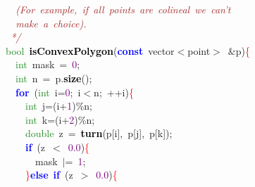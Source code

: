 {{\mbox{}\textit{\textcolor{Brown}{\ \ (For\ example,\ if\ all\ points\ are\ colineal\ we\ can't\ }} \\
\mbox{}\textit{\textcolor{Brown}{\ \ make\ a\ choice).}} \\
\mbox{}\textit{\textcolor{Brown}{\ */}} \\
\mbox{}\textcolor{ForestGreen}{bool}\ \textbf{\textcolor{Black}{isConvexPolygon}}\textcolor{BrickRed}{(}\textbf{\textcolor{Blue}{const}}\ vector\textcolor{BrickRed}{$<$}point\textcolor{BrickRed}{$>$}\ \textcolor{BrickRed}{\&}p\textcolor{BrickRed}{)}\textcolor{Red}{\{} \\
\mbox{}\ \ \textcolor{ForestGreen}{int}\ mask\ \textcolor{BrickRed}{=}\ \textcolor{Purple}{0}\textcolor{BrickRed}{;} \\
\mbox{}\ \ \textcolor{ForestGreen}{int}\ n\ \textcolor{BrickRed}{=}\ p\textcolor{BrickRed}{.}\textbf{\textcolor{Black}{size}}\textcolor{BrickRed}{();} \\
\mbox{}\ \ \textbf{\textcolor{Blue}{for}}\ \textcolor{BrickRed}{(}\textcolor{ForestGreen}{int}\ i\textcolor{BrickRed}{=}\textcolor{Purple}{0}\textcolor{BrickRed}{;}\ i\textcolor{BrickRed}{$<$}n\textcolor{BrickRed}{;}\ \textcolor{BrickRed}{++}i\textcolor{BrickRed}{)}\textcolor{Red}{\{} \\
\mbox{}\ \ \ \ \textcolor{ForestGreen}{int}\ j\textcolor{BrickRed}{=(}i\textcolor{BrickRed}{+}\textcolor{Purple}{1}\textcolor{BrickRed}{)\%}n\textcolor{BrickRed}{;} \\
\mbox{}\ \ \ \ \textcolor{ForestGreen}{int}\ k\textcolor{BrickRed}{=(}i\textcolor{BrickRed}{+}\textcolor{Purple}{2}\textcolor{BrickRed}{)\%}n\textcolor{BrickRed}{;} \\
\mbox{}\ \ \ \ \textcolor{ForestGreen}{double}\ z\ \textcolor{BrickRed}{=}\ \textbf{\textcolor{Black}{turn}}\textcolor{BrickRed}{(}p\textcolor{BrickRed}{[}i\textcolor{BrickRed}{],}\ p\textcolor{BrickRed}{[}j\textcolor{BrickRed}{],}\ p\textcolor{BrickRed}{[}k\textcolor{BrickRed}{]);} \\
\mbox{}\ \ \ \ \textbf{\textcolor{Blue}{if}}\ \textcolor{BrickRed}{(}z\ \textcolor{BrickRed}{$<$}\ \textcolor{Purple}{0.0}\textcolor{BrickRed}{)}\textcolor{Red}{\{} \\
\mbox{}\ \ \ \ \ \ mask\ \textcolor{BrickRed}{$|$=}\ \textcolor{Purple}{1}\textcolor{BrickRed}{;} \\
\mbox{}\ \ \ \ \textcolor{Red}{\}}\textbf{\textcolor{Blue}{else}}\ \textbf{\textcolor{Blue}{if}}\ \textcolor{BrickRed}{(}z\ \textcolor{BrickRed}{$>$}\ \textcolor{Purple}{0.0}\textcolor{BrickRed}{)}\textcolor{Red}{\{} \\
}}
